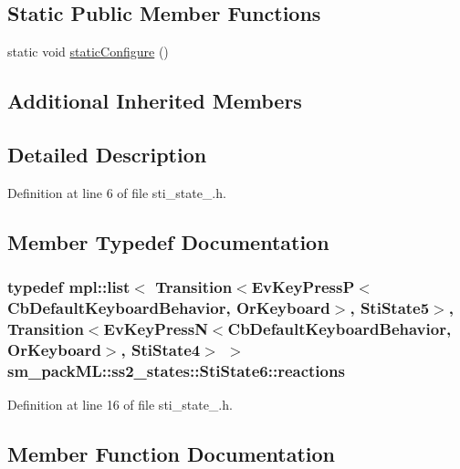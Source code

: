\subsection*{Static Public Member Functions}
\begin{DoxyCompactItemize}
\item 
static void \hyperlink{structsm__packML_1_1ss2__states_1_1StiState6_afadd4e4fd4b99a0e62f2f2f2e0edd706}{static\+Configure} ()
\end{DoxyCompactItemize}
\subsection*{Additional Inherited Members}


\subsection{Detailed Description}


Definition at line 6 of file sti\+\_\+state\+\_.\+h.



\subsection{Member Typedef Documentation}
\subsubsection[{\texorpdfstring{reactions}{reactions}}]{\setlength{\rightskip}{0pt plus 5cm}typedef mpl\+::list$<$ Transition$<$Ev\+Key\+PressP$<$Cb\+Default\+Keyboard\+Behavior, {\bf Or\+Keyboard}$>$, {\bf Sti\+State5}$>$, Transition$<$Ev\+Key\+PressN$<$Cb\+Default\+Keyboard\+Behavior, {\bf Or\+Keyboard}$>$, {\bf Sti\+State4}$>$ $>$ {\bf sm\+\_\+pack\+M\+L\+::ss2\+\_\+states\+::\+Sti\+State6\+::reactions}}\hypertarget{structsm__packML_1_1ss2__states_1_1StiState6_accbaf5ea9fbf21a028103e5eb0842738}{}\label{structsm__packML_1_1ss2__states_1_1StiState6_accbaf5ea9fbf21a028103e5eb0842738}


Definition at line 16 of file sti\+\_\+state\+\_.\+h.



\subsection{Member Function Documentation}
